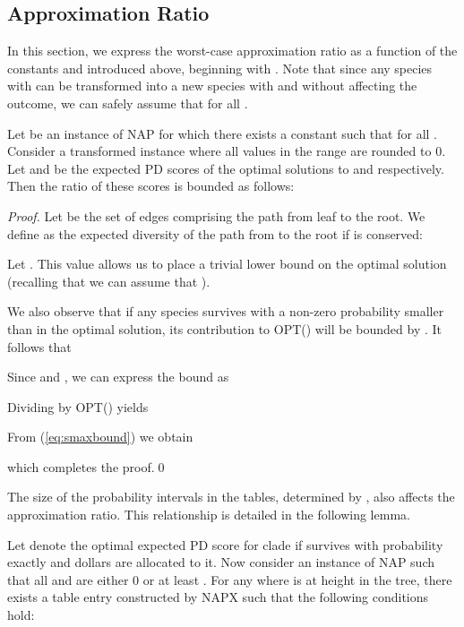 \documentclass[10pt]{llncs}       \usepackage{graphicx,subfigure}
\begin{document}
\subsection{Approximation Ratio}
In this section, we express the worst-case approximation ratio as a function 
of the constants  and  introduced above, 
beginning with .  Note that 
since any species  with  can be 
transformed into a new species  with  and
 without
affecting the outcome, we can safely assume that  for all 
. 
\begin{lemma}
  \label{lem:pmin}
Let  be an instance of NAP for which there exists a constant  such
that  for all . Consider 
a transformed instance  where
all  values in the range  are rounded to 0. Let  
and  be the expected PD scores of the optimal solutions to  and
 respectively. Then
the ratio of these scores is bounded as follows: 

\end{lemma}
\begin{proof}
Let  be the set of edges comprising the path from leaf  to
the root.  We define  as the expected diversity of the path from 
to the root if  is conserved:

Let .  
This value allows us to place a trivial lower bound on the optimal solution
(recalling that we can assume that ).

We also observe that if any species  survives with a non-zero probability
smaller than  in the optimal solution, its contribution to OPT()
will be bounded by .  It follows that 

Since  and , we can 
express the bound as
 
Dividing by OPT() yields

From (\ref{eq:smaxbound}) we obtain

which completes the proof.\qed
\end{proof}
The size of the probability intervals in the tables, determined by 
 , also affects the approximation ratio.  This relationship
is detailed in the following lemma.  
\begin{lemma}
\label{lem:rounding}
Let  denote
the optimal expected PD score for clade 
if  survives with 
probability exactly  and  dollars are allocated to it.
Now consider an instance of NAP such that all  and  are either 0 or 
at least . For any  where  is at height  in
the tree, there exists a table entry 
constructed by NAPX such that the following conditions hold:

\end{lemma}
\end{document}
